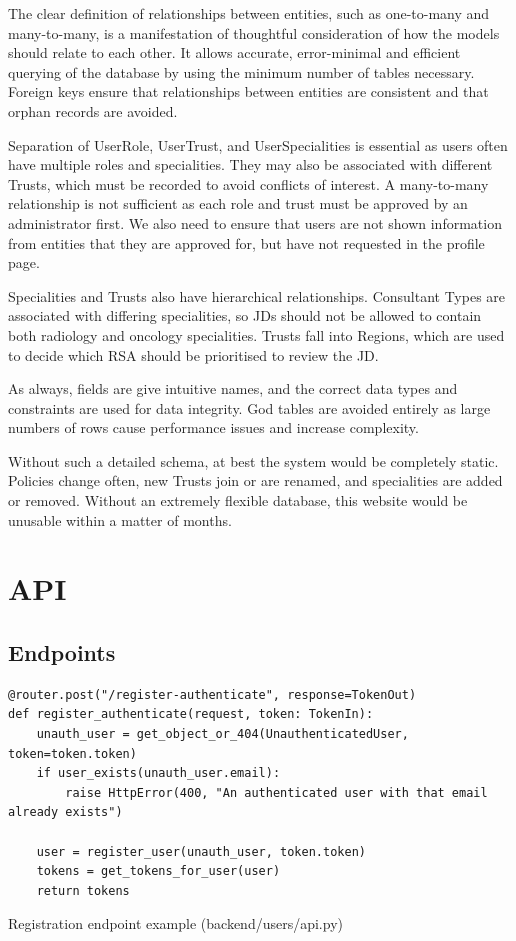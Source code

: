 The clear definition of relationships between entities, such as one-to-many and many-to-many, is a manifestation of thoughtful consideration of how the models should relate to each other. It allows accurate, error-minimal and efficient querying of the database by using the minimum number of tables necessary. Foreign keys ensure that relationships between entities are consistent and that orphan records are avoided.

Separation of UserRole, UserTrust, and UserSpecialities is essential as users often have multiple roles and specialities. They may also be associated with different Trusts, which must be recorded to avoid conflicts of interest. A many-to-many relationship is not sufficient as each role and trust must be approved by an administrator first. We also need to ensure that users are not shown information from entities that they are approved for, but have not requested in the profile page. 

Specialities and Trusts also have hierarchical relationships. Consultant Types are associated with differing specialities, so JDs should not be allowed to contain both radiology and oncology specialities. Trusts fall into Regions, which are used to decide which RSA should be prioritised to review the JD.

As always, fields are give intuitive names, and the correct data types and constraints are used for data integrity. God tables are avoided entirely as large numbers of rows cause performance issues and increase complexity.

Without such a detailed schema, at best the system would be completely static. Policies change often, new Trusts join or are renamed, and specialities are added or removed. Without an extremely flexible database, this website would be unusable within a matter of months.

\section{API}
\subsection{Endpoints}
\begin{listing}[!ht]
\begin{verbatim}
@router.post("/register-authenticate", response=TokenOut)
def register_authenticate(request, token: TokenIn):
    unauth_user = get_object_or_404(UnauthenticatedUser, token=token.token)
    if user_exists(unauth_user.email):
        raise HttpError(400, "An authenticated user with that email already exists")
    
    user = register_user(unauth_user, token.token)
    tokens = get_tokens_for_user(user)
    return tokens
\end{verbatim}
\caption{Registration endpoint example (backend/users/api.py)}
\label{lst:register}
\end{listing}

